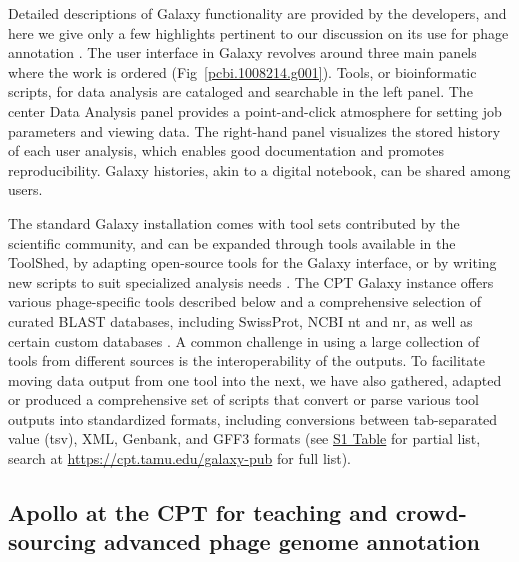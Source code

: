 Detailed descriptions of Galaxy functionality are provided by the
developers, and here we give only a few highlights pertinent to our
discussion on its use for phage annotation \cite{Afgan_2018}. The user interface
in Galaxy revolves around three main panels where the work is ordered
(Fig~\ref{pcbi.1008214.g001}). Tools, or bioinformatic
scripts, for data analysis are cataloged and searchable in the left
panel. The center Data Analysis panel provides a point-and-click
atmosphere for setting job parameters and viewing data. The right-hand
panel visualizes the stored history of each user analysis, which enables
good documentation and promotes reproducibility. Galaxy histories, akin
to a digital notebook, can be shared among users.

The standard Galaxy installation comes with tool sets contributed by the
scientific community, and can be expanded through tools available in the
ToolShed, by adapting open-source tools for the Galaxy interface, or by
writing new scripts to suit specialized analysis needs \cite{Blankenberg_2014,Cock_2013,Cock_2009}. The
CPT Galaxy instance offers various phage-specific tools described below
and a comprehensive selection of curated BLAST databases, including
SwissProt, NCBI nt and nr, as well as certain custom databases \cite{2018}.
A common challenge in using a large collection of tools from different
sources is the interoperability of the outputs. To facilitate moving
data output from one tool into the next, we have also gathered, adapted
or produced a comprehensive set of scripts that convert or parse various
tool outputs into standardized formats, including conversions between
tab-separated value (tsv), XML, Genbank, and GFF3 formats (see
\protect\hyperlink{pcbi.1008214.s001}{S1 Table} for partial list, search
at \url{https://cpt.tamu.edu/galaxy-pub} for full list).

\subsection*{Apollo at the CPT for teaching and crowd-sourcing advanced
phage genome annotation}

